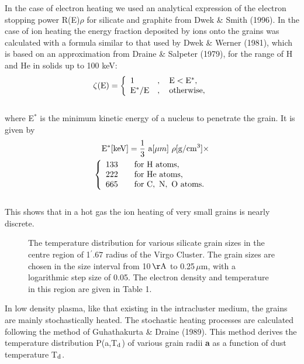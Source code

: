 \documentclass[]{aa}
\begin{document}
In the case of electron heating we used an analytical expression of
the electron stopping power R(E)$\rho$ for silicate and graphite 
from Dwek \& Smith (1996). In the case of ion heating the energy fraction 
deposited by ions onto the grains was calculated with a formula
similar to that used by Dwek \& Werner (1981), which is based on an 
approximation from Draine \& Salpeter (1979), for the range of H and He in 
solids up to 100 keV:
\begin{eqnarray}
  \zeta({\rm E})=\left\{
	\begin{array}{ll}
		1 &, \quad {\rm E}< {\rm E^*},\\
		{\rm E^*/E} &, \quad {\rm otherwise},\\
	\end{array}
	\right.
\end{eqnarray}
\\
where E$^*$ is the minimum kinetic energy of a nucleus to penetrate the
grain. It is given by
\begin{eqnarray}
  {\rm E^*[keV]} = \frac{1}{3}~{\rm a}[\mu m]~\rho[{\rm g/cm^3}]\times \\ \nonumber
	\left\{
	\begin{array}{ll}
		133 & \quad {\rm for~H~atoms}, \\
		222 & \quad {\rm for~He~atoms}, \\
		665 & \quad {\rm for~C,~N,~O~atoms}. \\
	\end{array}
	\right.
\end{eqnarray}
\\
This shows that in a hot gas the ion heating of very small grains is nearly
discrete. 

\begin{figure}[htb]
\caption[]{The temperature distribution for various silicate grain sizes in the
centre region of 1$^{\prime}.67$ radius of the Virgo Cluster. The grain sizes
are chosen in the size interval from 10\,${\rm \AA}$ to 0.25\,${\mu}$m, with a
logarithmic step size of 0.05. The electron
density and temperature in this region are given in Table 1.}
\end{figure} 

In low density plasma, like that existing in the intracluster medium, the
grains are mainly stochastically heated. The stochastic heating processes are 
calculated following the method of Guhathakurta \& Draine (1989). This method
derives the temperature distribution P(a,T$_{\rm d}$)
of various grain radii {\bf a} as a function of dust temperature T$_{\rm d}$.
\end{document}
